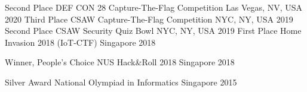 


\begin{cvhonors}

  \cvhonor
    {Second Place} %
    {DEF CON 28 Capture-The-Flag Competition} %
    {Las Vegas, NV, USA} %
    {2020} %
  \cvhonor
    {Third Place} %
    {CSAW Capture-The-Flag Competition} %
    {NYC, NY, USA} %
    {2019} %
  \cvhonor
    {Second Place} %
    {CSAW Security Quiz Bowl} %
    {NYC, NY, USA} %
    {2019} %
  \cvhonor
    {First Place} %
    {Home Invasion 2018 (IoT-CTF)} %
    {Singapore} %
    {2018} %


  \cvhonor
    {Winner, People's Choice} %
    {NUS Hack\&Roll 2018} %
    {Singapore} %
    {2018} %

  \cvhonor
    {Silver Award} %
    {National Olympiad in Informatics} %
    {Singapore} %
    {2015} %

\end{cvhonors}
